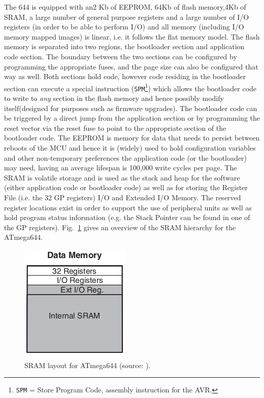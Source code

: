 	The 644 is equipped with an2 Kb of EEPROM, 64Kb of flash memory,4Kb of SRAM, a large number of general purpose registers and a large number of I/O registers (in order to be able to perform I/O) and all memory (including I/O memory mapped images) is linear, i.e. it follows the flat memory model. The flash memory is separated into two regions, the bootloader section and application code section. The boundary between the two sections can be configured by programming the appropriate fuses, and the page size can also be configured that way as well. Both sections hold code, however code residing in the bootloader section can execute a special instruction (\texttt{SPM}\footnote{\texttt{SPM} = Store Program Code, assembly instruction for the AVR.}) which allows the bootloader code to write to \textit{any} section in the flash memory and hence possibly modify itself(designed for purposes such as firmware upgrades). The bootloader code can be triggered by a direct jump from the application section or by programming the reset vector via the reset fuse to point to the appropriate section of the bootloader code. The EEPROM is memory for data that needs to persist between reboots of the MCU and hence it is (widely) used to hold configuration variables and other non-temporary preferences the application code (or the bootloader) may need, having an average lifespan is 100,000 write cycles per page. The SRAM is volatile storage and is used as the stack and heap for the software (either application code or bootloader code) as well as for storing the Register File (i.e. the 32 GP registers) I/O and Extended I/O Memory. The reserved register locations exist in order to support the use of peripheral units as well as hold program status information (e.g. the Stack Pointer can be found in one of the GP registers). Fig.~\ref{fig:stack} gives an overview of the SRAM hierarchy for the ATmega644.
	
	\begin{figure}
		\center
		\includegraphics[scale=0.7]{img/stack.png}
		\caption{\footnotesize SRAM layout for ATmega644 (source: \protect\citep{atmega_manual}).}
		\label{fig:stack}		
	\end{figure}

